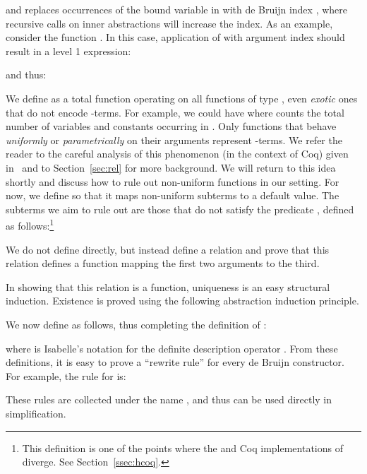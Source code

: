 \documentclass[final]{svjour3}
\begin{document}
and  replaces occurrences of the bound variable in 
with de Bruijn index , where recursive calls on inner abstractions
will increase the index.  As an example, consider the function
.  In this
case, application of  with argument index  should result
in a level 1 expression:

and thus:


We define  as a total function operating on all functions
of type , even \emph{exotic} ones
that do not encode -terms.  For example, we could have  where  counts the total
number of variables and constants occurring in .  Only functions
that behave \emph{uniformly} or \emph{parametrically} on their
arguments represent -terms.  We refer the reader to the
careful analysis of this phenomenon (in the context of Coq) given
in~\cite{DFHtlca95} and to Section~\ref{sec:rel} for more background.
We will return to this idea shortly and discuss how to rule out
non-uniform functions in our setting.  For now, we define 
so that it maps non-uniform subterms to a default value.  The subterms
we aim to rule out are those that do not satisfy the predicate
, defined as
follows:\footnote{This definition is one of the points where the \HOL
  and Coq implementations of \hybrid diverge.  See
  Section~\ref{ssec:hcoq}.  }
 
\begin{sloppypar}
We do not define  directly, but instead define a relation
\mbox{} and
prove that this relation defines a function mapping the first two
arguments to the third.
\end{sloppypar}

In showing that this relation is a function, uniqueness is an easy
structural induction. Existence is proved using the following
abstraction induction principle.
\begin{goal}
 
\label{thm:abstractioninduct}
\end{goal}

We now define  as follows, thus completing the definition of :

where  is Isabelle's notation for the
definite description operator .
From these definitions, it is easy to prove a ``rewrite rule'' for
every de Bruijn constructor.  For example, the rule for
 is:
\begin{mclemma}
  
\end{mclemma}
These rules are collected under the name , and thus
can be used directly in simplification.
\end{document}
